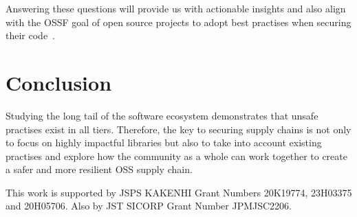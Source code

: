 \documentclass[sigconf,screen]{acmart}
\begin{document}
\begin{sloppy}
Answering these questions will provide us with actionable insights and also align with the OSSF goal of open source projects to adopt best practises when securing their code~\citep{GitHubos27:online}.



\section{Conclusion}
Studying the long tail of the software ecosystem demonstrates that unsafe practises exist in all tiers.
Therefore, the key to securing supply chains is not only to focus on highly impactful libraries but also to take into account existing practises and explore how the community as a whole can work together to create a safer and more resilient OSS supply chain.

\begin{acks}
This work is supported by JSPS KAKENHI Grant Numbers 20K19774, 23H03375 and 20H05706. Also by JST SICORP Grant Number JPMJSC2206.
\end{acks}


%


\end{sloppy}
\end{document}
